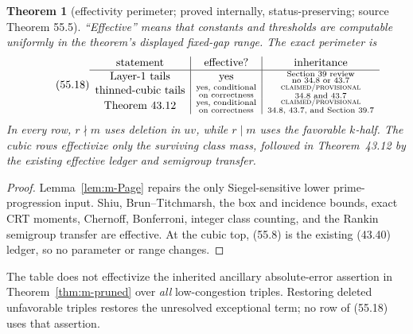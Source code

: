 \documentclass[10pt,reqno]{amsart}
\newtheorem{theorem}{Theorem}[section]
\theoremstyle{definition}
\newcommand{\1}{\mathbf 1}
\begin{document}
\begin{theorem}[effectivity perimeter; proved internally,
status-preserving; source Theorem 55.5]\label{thm:m-effectivity}
``Effective'' means that constants and thresholds are computable uniformly
in the theorem's displayed fixed-gap range.  The exact perimeter is
\begin{equation}\tag{55.18}
\begin{array}{c|c|c}
 \text{statement}&\text{effective?}&\text{inheritance}\\ \hline
 \text{Layer-1 tails}&\text{yes}
   &\substack{\text{Section~39 review}\\\text{no 34.8 or 43.7}}\\
 \text{thinned-cubic tails}&\substack{\text{yes, conditional}\\
                                      \text{on correctness}}
   &\substack{\text{\textsc{claimed/provisional}}\\\text{34.8 and 43.7}}\\
 \text{Theorem~43.12}&\substack{\text{yes, conditional}\\
                                \text{on correctness}}
   &\substack{\text{\textsc{claimed/provisional}}\\
              \text{34.8, 43.7, and Section~39.7}}
\end{array}
\end{equation}
In every row, $r\nmid m$ uses deletion in $uv$, while $r\mid m$ uses the
favorable $k$-half.  The cubic rows effectivize only the surviving class
mass, followed in Theorem~43.12 by the existing effective ledger and
semigroup transfer.
\end{theorem}
\begin{proof}
Lemma~\ref{lem:m-Page} repairs the only Siegel-sensitive lower
prime-progression input.  Shiu, Brun--Titchmarsh, the box and incidence
bounds, exact CRT moments, Chernoff, Bonferroni, integer class counting, and
the Rankin semigroup transfer are effective.  At the cubic top, (55.8) is
the existing (43.40) ledger, so no parameter or range changes.
\end{proof}
The table does not effectivize the inherited ancillary absolute-error
assertion in Theorem~\ref{thm:m-pruned} over \emph{all} low-congestion
triples.  Restoring deleted unfavorable triples restores the unresolved
exceptional term; no row of (55.18) uses that assertion.
\end{document}
